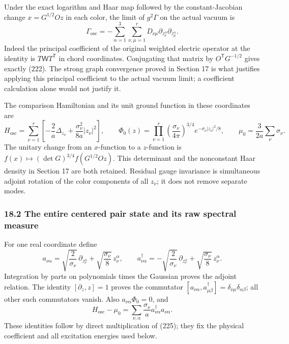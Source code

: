 \documentclass[
  11pt,
]{article}
\begin{document}
Under the exact logarithm and Haar map followed by the constant-Jacobian
change \(x=G^{1/2}Oz\) in each color, the limit of \(g^2\Gamma\) on the
actual vacuum is \[
 \Gamma_{\mathrm{osc}}=
   -\sum_{\alpha=1}^3\sum_{\nu,\mu=1}^r
       D_{\nu\mu}\partial_{z_\nu^\alpha}\partial_{z_\mu^\alpha}.
 \tag{223}
\] Indeed the principal coefficient of the original weighted electric
operator at the identity is \(T\mathsf W T^{\mathsf T}\) in chord
coordinates. Conjugating that matrix by \(O^{\mathsf T}G^{-1/2}\) gives
exactly (222). The strong graph convergence proved in Section 17 is what
justifies applying this principal coefficient to the actual vacuum
limit; a coefficient calculation alone would not justify it.

The comparison Hamiltonian and its unit ground function in these
coordinates are \[
 H_{\mathrm{osc}}=\sum_{\nu=1}^r
   \left[-\frac2a\Delta_{z_\nu}
                 +\frac{\sigma_\nu^2}{8a}|z_\nu|^2\right],
 \qquad
 \Phi_0(z)=\prod_{\nu=1}^r
       \left(\frac{\sigma_\nu}{4\pi}\right)^{3/4}
       e^{-\sigma_\nu|z_\nu|^2/8},
 \qquad
 \mu_0=\frac3{2a}\sum_\nu\sigma_\nu .
 \tag{224}
\] The unitary change from an \(x\)-function to a \(z\)-function is
\(f(x)\mapsto(\det G)^{3/4}f(G^{1/2}Oz)\). This determinant and the
nonconstant Haar density in Section 17 are both retained. Residual gauge
invariance is simultaneous adjoint rotation of the color components of
all \(z_\nu\); it does not remove separate modes.

\subsubsection{18.2 The entire centered pair state and its raw spectral
measure}\label{the-entire-centered-pair-state-and-its-raw-spectral-measure}

For one real coordinate define \[
 a_{\nu\alpha}=
   \sqrt{\frac2{\sigma_\nu}}\,\partial_{z_\nu^\alpha}
       +\sqrt{\frac{\sigma_\nu}{8}}\,z_\nu^\alpha,\qquad
 a_{\nu\alpha}^{\dagger}=
   -\sqrt{\frac2{\sigma_\nu}}\,\partial_{z_\nu^\alpha}
       +\sqrt{\frac{\sigma_\nu}{8}}\,z_\nu^\alpha .
 \tag{225}
\] Integration by parts on polynomials times the Gaussian proves the
adjoint relation. The identity \([\partial_z,z]=1\) proves the
commutator \([a_{\nu\alpha},a_{\mu\beta}^{\dagger}]
=\delta_{\nu\mu}\delta_{\alpha\beta}\); all other such commutators
vanish. Also \(a_{\nu\alpha}\Phi_0=0\), and \[
 H_{\mathrm{osc}}-\mu_0
   =\sum_{\nu,\alpha}\frac{\sigma_\nu}{a}
                      a_{\nu\alpha}^{\dagger}a_{\nu\alpha}.
 \tag{226}
\] These identities follow by direct multiplication of (225); they fix
the physical coefficient and all excitation energies used below.
\end{document}
